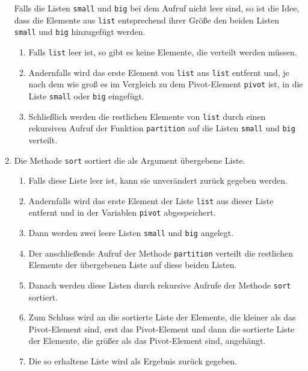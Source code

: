 \begin{enumerate}
      Falls die Listen \texttt{small} und \texttt{big} bei dem Aufruf nicht leer sind,
      so ist die Idee, dass die Elemente aus \texttt{list} entsprechend ihrer Gr\"o{\ss}e
      den beiden Listen \texttt{small} und \texttt{big} hinzugef\"ugt werden.
      \begin{enumerate}
      \item Falls \texttt{list} leer ist, so gibt es keine Elemente, die verteilt werden
            m\"ussen.
      \item Andernfalls wird das erste Element von \texttt{list} aus \texttt{list}
            entfernt und, je nach dem wie gro{\ss} es im Vergleich zu dem Pivot-Element
            \texttt{pivot} ist, in die Liste \texttt{small} oder \texttt{big} eingef\"ugt.
      \item Schlie{\ss}lich werden die restlichen Elemente von \texttt{list} durch einen
            rekursiven Aufruf der Funktion \texttt{partition} auf die Listen \texttt{small}
            und \texttt{big} verteilt.
      \end{enumerate}
\item Die Methode \texttt{sort} sortiert die als Argument \"ubergebene Liste. 
      \begin{enumerate}
      \item Falls diese Liste leer ist, kann sie unver\"andert zur\"uck gegeben werden.
      \item Andernfalls wird das erste Element der Liste \texttt{list} aus dieser Liste
            entfernt und in der Variablen \texttt{pivot}
            abgespeichert.
      \item Dann werden zwei leere Listen \texttt{small} und \texttt{big} angelegt.
      \item Der anschlie{\ss}ende Aufruf der Methode \texttt{partition} verteilt die restlichen
            Elemente der \"ubergebenen Liste auf diese beiden Listen.
      \item Danach werden diese Listen durch rekursive Aufrufe der Methode
            \texttt{sort} sortiert.
      \item Zum Schluss wird an die sortierte Liste der Elemente, die kleiner als das
            Pivot-Element sind, erst das Pivot-Element und dann die sortierte Liste der Elemente,
            die gr\"o{\ss}er als das Pivot-Element sind, angeh\"angt.
      \item Die so erhaltene Liste wird als Ergebnis zur\"uck gegeben.
      \end{enumerate}
\end{enumerate}

